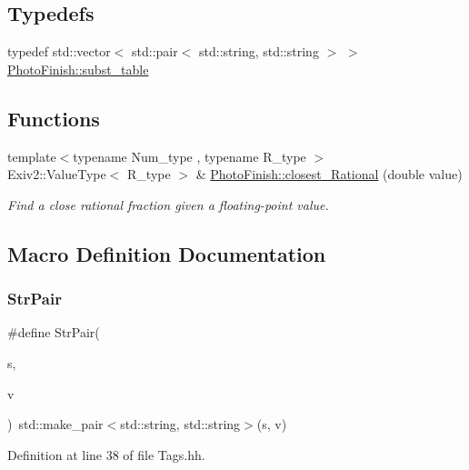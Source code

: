 \subsection*{Typedefs}
\begin{DoxyCompactItemize}
\item 
typedef std\+::vector$<$ std\+::pair$<$ std\+::string, std\+::string $>$ $>$ \hyperlink{namespace_photo_finish_a99d3cfc086c8264e778255f5ef2b8b19}{Photo\+Finish\+::subst\+\_\+table}
\end{DoxyCompactItemize}
\subsection*{Functions}
\begin{DoxyCompactItemize}
\item 
{\footnotesize template$<$typename Num\+\_\+type , typename R\+\_\+type $>$ }\\Exiv2\+::\+Value\+Type$<$ R\+\_\+type $>$ \& \hyperlink{namespace_photo_finish_ae830bdcf87b4a84d55d039ed80a11151}{Photo\+Finish\+::closest\+\_\+\+Rational} (double value)
\begin{DoxyCompactList}\small\item\em Find a close rational fraction given a floating-\/point value. \end{DoxyCompactList}\end{DoxyCompactItemize}


\subsection{Macro Definition Documentation}
\mbox{\label{_tags_8hh_a19c06ce5d6cdc9b5a13fd3eae3dfa411}} 
\subsubsection{\texorpdfstring{Str\+Pair}{StrPair}}
{\footnotesize\ttfamily \#define Str\+Pair(\begin{DoxyParamCaption}\item[{}]{s,  }\item[{}]{v }\end{DoxyParamCaption})~std\+::make\+\_\+pair$<$std\+::string, std\+::string$>$(s, v)}



Definition at line 38 of file Tags.\+hh.

